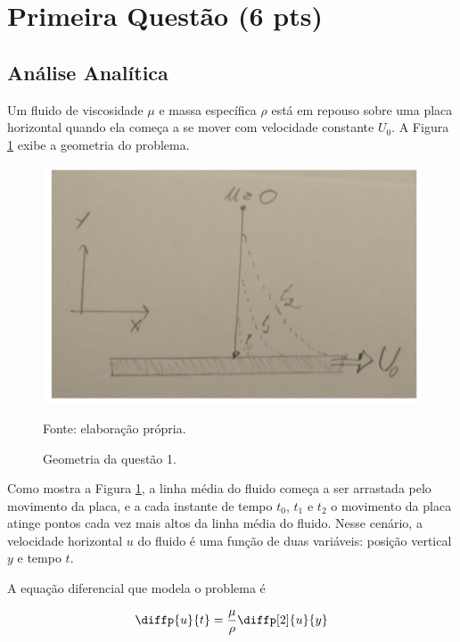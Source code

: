 
\section{Primeira Questão (6 pts)}

\subsection{Análise Analítica}


Um fluido de viscosidade $\mu$ e massa específica $\rho$ está em repouso
sobre uma placa horizontal quando ela começa a se mover com velocidade constante
$U_0$. A Figura \ref*{fig:geometriaQ1} exibe a geometria do problema.


\begin{figure}[h!]
    \caption{Geometria da questão 1.}
    \label{fig:geometriaQ1}
    \centering
    \centerline{\includegraphics[scale=0.5]{geometriaQ1.png}}
    \par{Fonte: elaboração própria.}
\end{figure}

Como mostra a Figura \ref*{fig:geometriaQ1}, a linha média do fluido começa
a ser arrastada pelo movimento da placa, e a cada instante de tempo $t_0$,
$t_1$ e $t_2$ o movimento da placa atinge pontos cada vez mais altos
da linha média do fluido. Nesse cenário, a velocidade horizontal $u$ do
fluido é uma função de duas variáveis: posição vertical $y$ e tempo $t$.

A equação diferencial que modela o problema é

\begin{equation}\label{eq:modeloQ1}
    \diffp{u}{t} = \frac{\mu}{\rho} \diffp[2]{u}{y}
\end{equation}

